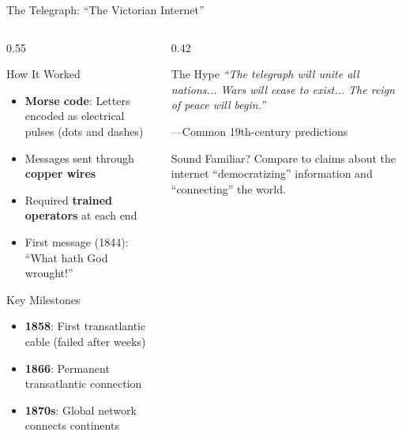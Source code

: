 \documentclass[aspectratio=169]{beamer}
\begin{document}
\begin{frame}{The Telegraph: ``The Victorian Internet''}
\begin{columns}
\begin{column}{0.55\textwidth}
\begin{block}{How It Worked}
\begin{itemize}
  \item \textbf{Morse code}: Letters encoded as electrical pulses (dots and dashes)
  \item Messages sent through \textbf{copper wires}
  \item Required \textbf{trained operators} at each end
  \item First message (1844): ``What hath God wrought!''
\end{itemize}
\end{block}

\begin{exampleblock}{Key Milestones}
\begin{itemize}
  \item \textbf{1858}: First transatlantic cable (failed after weeks)
  \item \textbf{1866}: Permanent transatlantic connection
  \item \textbf{1870s}: Global network connects continents
\end{itemize}
\end{exampleblock}
\end{column}

\begin{column}{0.42\textwidth}
\begin{alertblock}{The Hype}
\small
\textit{``The telegraph will unite all nations... Wars will cease to exist... The reign of peace will begin.''}

\vspace{0.3em}
---Common 19th-century predictions
\end{alertblock}

\vspace{0.3em}
\begin{block}{Sound Familiar?}
Compare to claims about the internet ``democratizing'' information and ``connecting'' the world.
\end{block}
\end{column}
\end{columns}
\end{frame}
\end{document}
